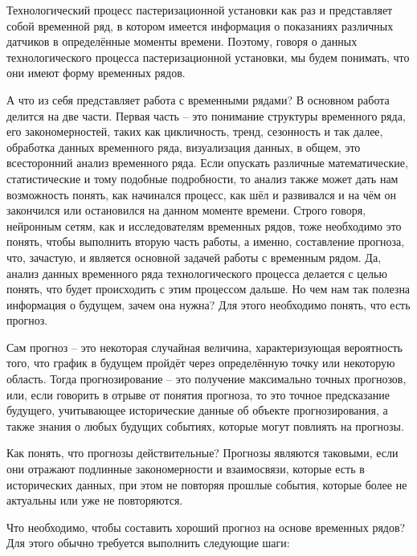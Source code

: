 {  \par \redline Технологический процесс пастеризационной установки как раз и представляет собой временной ряд, в котором имеется информация о показаниях различных датчиков в определённые моменты времени. Поэтому, говоря о данных технологического процесса пастеризационной установки, мы будем понимать, что они имеют форму временных рядов.

  \par \redline А что из себя представляет работа с временными рядами? В основном работа делится на две части. Первая часть {--} это понимание структуры временного ряда, его закономерностей, таких как цикличность, тренд, сезонность и так далее, обработка данных временного ряда, визуализация данных, в общем, это всесторонний анализ временного ряда. Если опускать различные математические, статистические и тому подобные подробности, то анализ также может дать нам возможность понять, как начинался процесс, как шёл и развивался и на чём он закончился или остановился на данном моменте времени.  Строго говоря, нейронным сетям, как и исследователям временных рядов, тоже необходимо это понять, чтобы выполнить вторую часть работы, а именно, составление прогноза, что, зачастую, и является основной задачей работы с временным рядом. Да, анализ данных временного ряда технологического процесса делается с целью понять, что будет происходить с этим процессом дальше. Но чем нам так полезна информация о будущем, зачем она нужна? Для этого необходимо понять, что есть прогноз. 

  \par \redline Сам прогноз {--} это некоторая случайная величина, характеризующая вероятность того, что график в будущем пройдёт через определённую точку или некоторую область. Тогда прогнозирование {--} это получение максимально точных прогнозов, или, если говорить в отрыве от понятия прогноза, то это точное предсказание будущего, учитывающее исторические данные об объекте прогнозирования, а также знания о любых будущих событиях, которые могут повлиять на прогнозы. 

  \par \redline Как понять, что прогнозы действительные? Прогнозы являются таковыми, если они отражают подлинные закономерности и взаимосвязи, которые есть в исторических данных, при этом не повторяя прошлые события, которые более не актуальны или уже не повторяются. 

  \par \redline Что необходимо, чтобы составить хороший прогноз на основе временных рядов? Для этого обычно требуется выполнить следующие шаги:

}
